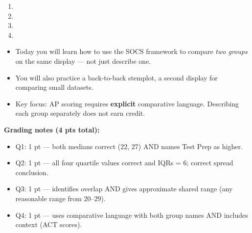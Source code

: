 \documentclass[10pt]{article}
\begin{document}
\begin{enumerate}[leftmargin=1.5em, itemsep=8pt]

  \item {}

  \item {}

  \item {}

  \item {}

\end{enumerate}

\vspace{0.14in}

\begin{tcolorbox}[colback=greenbg, colframe=greenacc, boxrule=0.8pt, arc=2mm,
    left=4mm, right=4mm, top=3mm, bottom=3mm]
\small
\begin{itemize}[leftmargin=1.3em, itemsep=5pt]
  \item Today you will learn how to use the SOCS framework to compare
        \textit{two groups} on the same display --- not just describe one.
  \item You will also practice a back-to-back stemplot, a second display
        for comparing small datasets.
  \item Key focus: AP scoring requires \textbf{explicit} comparative
        language. Describing each group separately does not earn credit.
\end{itemize}
\end{tcolorbox}

\begin{teachernote}
\textbf{Grading notes (4 pts total):}
\begin{itemize}[itemsep=2pt]
  \item Q1: 1 pt --- both medians correct (22, 27) AND names Test Prep as higher.
  \item Q2: 1 pt --- all four quartile values correct and IQRs = 6; correct spread conclusion.
  \item Q3: 1 pt --- identifies overlap AND gives approximate shared range (any reasonable range from 20--29).
  \item Q4: 1 pt --- uses comparative language with both group names AND includes context (ACT scores).
\end{itemize}
\end{teachernote}
\end{document}
